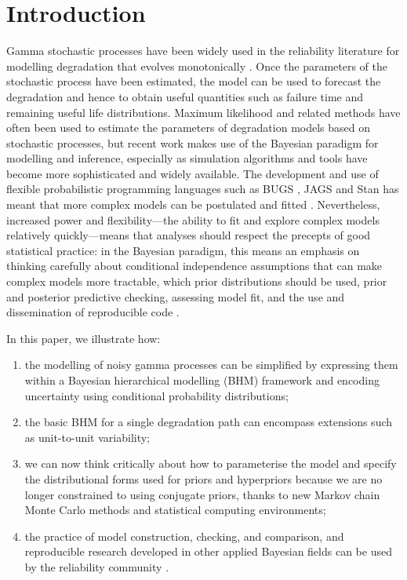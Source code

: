 \documentclass{article}
\begin{document}
\section{Introduction}
Gamma stochastic processes have been widely used in the reliability literature for modelling degradation that evolves monotonically \citep{lawless_covariates_2004}. Once the parameters of the stochastic process have been estimated, the model can be used to forecast the degradation and hence to obtain useful quantities such as failure time and remaining useful life distributions. Maximum likelihood and related methods have often been used to estimate the parameters of degradation models based on stochastic processes, but recent work makes use of the Bayesian paradigm for modelling and inference, especially as simulation algorithms and tools have become more sophisticated and widely available. The development and use of flexible probabilistic programming languages such as BUGS \citep{Lunn_2012}, JAGS \citep{Plummer_2003} and Stan \citep{Stan_2022} has meant that more complex models can be postulated and fitted \citep{McElreath_2020}. Nevertheless, increased power and flexibility---the ability to fit and explore complex models relatively quickly---means that analyses should respect the precepts of good statistical practice: in the Bayesian paradigm, this means an emphasis on thinking carefully about conditional independence assumptions that can make complex models more tractable, which prior distributions should be used, prior and posterior predictive checking, assessing model fit, and the use and dissemination of reproducible code \citep{gelman_bayesian_2020}.

In this paper, we illustrate how:
\begin{enumerate}
    \item the modelling of noisy gamma processes can be simplified by expressing them within a Bayesian hierarchical modelling (BHM) framework \citep{Berliner_1996, cressie_statistics_2011} and encoding uncertainty using conditional probability distributions; 
    \item the basic BHM for a single degradation path can encompass extensions such as unit-to-unit variability;
    \item we can now think critically about how to parameterise the model and specify the distributional forms used for priors and hyperpriors because we are no longer constrained to using conjugate priors, thanks to new Markov chain Monte Carlo methods and statistical computing environments;
    \item the practice of model construction, checking, and comparison, and reproducible research developed in other applied Bayesian fields can be used by the reliability community \citep{gelman_bayesian_2020}.
\end{enumerate}
\end{document}
